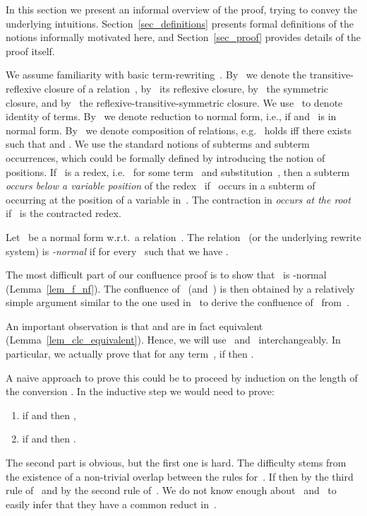 \documentclass[a4paper,UKenglish]{lipics-v2016}
\begin{document}
In this section we present an informal overview of the proof, trying
to convey the underlying intuitions. Section~\ref{sec_definitions}
presents formal definitions of the notions informally motivated here,
and Section~\ref{sec_proof} provides details of the proof itself.

We assume familiarity with basic
term-rewriting~\cite{BaaderNipkow1999,Terese2003}. By~ we
denote the transitive-reflexive closure of a relation~,
by~ its reflexive closure, by~ the
symmetric closure, and by~ the reflexive-transitive-symmetric
closure. We use~ to denote identity of terms. By~ we
denote reduction to normal form, i.e.,  if 
and~ is in normal form. By~ we denote composition of
relations, e.g.~ holds iff there exists~
such that  and . We use the standard notions
of subterms and subterm occurrences, which could be formally defined
by introducing the notion of positions. If~ is a redex,
i.e.~ for some term~ and substitution~,
then a subterm~ \emph{occurs below a variable position} of the
redex~ if~ occurs in a subterm of~ occurring at the position
of a variable in~. The contraction in  \emph{occurs at
  the root} if~ is the contracted redex.

Let~ be a normal form w.r.t.~a relation~. The relation~
(or the underlying rewrite system) is \emph{-normal} if for
every~ such that  we have .

The most difficult part of our confluence proof is to show that~
is -normal (Lemma~\ref{lem_f_nf}). The confluence of~
(and~) is then obtained by a relatively simple argument similar
to the one used in~\cite{Vrijer1999} to derive the confluence
of~ from~.

An important observation is that  and
 are in fact equivalent
(Lemma~\ref{lem_clc_equivalent}). Hence, we will use~
and~ interchangeably. In particular, we actually prove
that for any term~, if  then
.

A naive approach to prove this could be to proceed by induction on the
length of the conversion . In the inductive step we
would need to prove:
\begin{enumerate}
\item if  and  then
  ,
\item if  and
   then .
\end{enumerate}
The second part is obvious, but the first one is hard. The difficulty
stems from the existence of a non-trivial overlap between the rules
for~. If  then 
by the third rule of~ and  by
the second rule of~. We do not know enough about~
and~ to easily infer that they have a common reduct in~.
\end{document}
